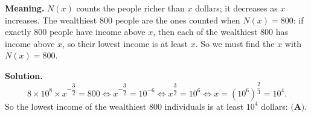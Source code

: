 \textbf{Meaning.} $N(x)$ counts the people richer than $x$ dollars; it decreases as $x$ increases. The wealthiest $800$ people are the ones counted when $N(x)=800$: if exactly $800$ people have income above $x$, then each of the wealthiest $800$ has income above $x$, so their lowest income is at least $x$. So we must find the $x$ with $N(x)=800$.

\textbf{Solution.}
\[8\times10^{8}\times x^{-\dfrac32}=800\iff x^{-\dfrac32}=10^{-6}\iff x^{\dfrac32}=10^{6}\iff x=\left(10^6\right)^{\dfrac23}=10^4.\]
So the lowest income of the wealthiest $800$ individuals is at least $10^4$ dollars: $\boxed{\textbf{(A)}}$.

